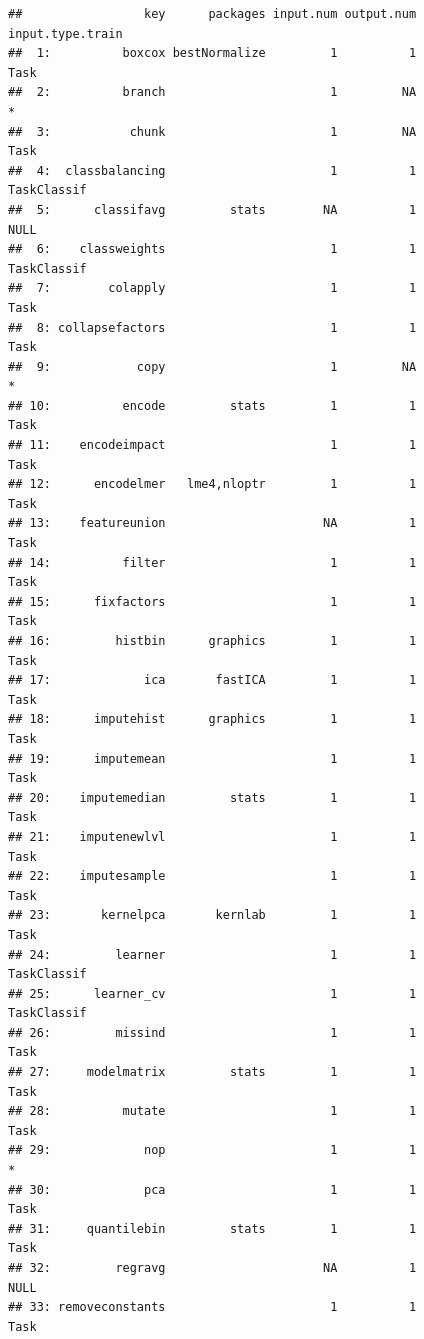\documentclass[]{scrbook}
\begin{document}
\begin{verbatim}
##                 key      packages input.num output.num input.type.train
##  1:          boxcox bestNormalize         1          1             Task
##  2:          branch                       1         NA                *
##  3:           chunk                       1         NA             Task
##  4:  classbalancing                       1          1      TaskClassif
##  5:      classifavg         stats        NA          1             NULL
##  6:    classweights                       1          1      TaskClassif
##  7:        colapply                       1          1             Task
##  8: collapsefactors                       1          1             Task
##  9:            copy                       1         NA                *
## 10:          encode         stats         1          1             Task
## 11:    encodeimpact                       1          1             Task
## 12:      encodelmer   lme4,nloptr         1          1             Task
## 13:    featureunion                      NA          1             Task
## 14:          filter                       1          1             Task
## 15:      fixfactors                       1          1             Task
## 16:         histbin      graphics         1          1             Task
## 17:             ica       fastICA         1          1             Task
## 18:      imputehist      graphics         1          1             Task
## 19:      imputemean                       1          1             Task
## 20:    imputemedian         stats         1          1             Task
## 21:    imputenewlvl                       1          1             Task
## 22:    imputesample                       1          1             Task
## 23:       kernelpca       kernlab         1          1             Task
## 24:         learner                       1          1      TaskClassif
## 25:      learner_cv                       1          1      TaskClassif
## 26:         missind                       1          1             Task
## 27:     modelmatrix         stats         1          1             Task
## 28:          mutate                       1          1             Task
## 29:             nop                       1          1                *
## 30:             pca                       1          1             Task
## 31:     quantilebin         stats         1          1             Task
## 32:         regravg                      NA          1             NULL
## 33: removeconstants                       1          1             Task

\end{verbatim}
\end{document}
